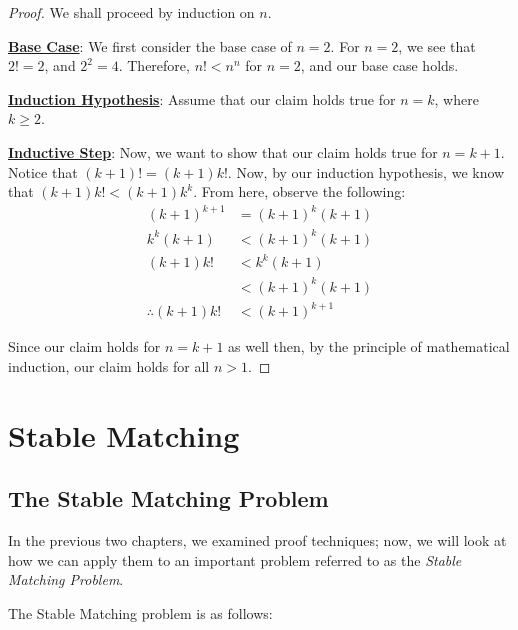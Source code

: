 \documentclass[openany]{book}
\begin{document}
\begin{proof}
	We shall proceed by induction on $n$.
	
	\textbf{\underline{Base Case}}: We first consider the base case of $n=2$. For $n=2$, we see that $2!=2$, and $2^{2}=4$. Therefore, $n! < n^{n}$ for $n=2$, and our base case holds.
	
	\textbf{\underline{Induction Hypothesis}}: Assume that our claim holds true for $n=k$, where $k \geq 2$.
	
	\textbf{\underline{Inductive Step}}: Now, we want to show that our claim holds true for $n=k+1$. Notice that $(k+1)! = (k+1)k!$. Now, by our induction hypothesis, we know that $(k+1)k! < (k+1)k^{k}$. From here, observe the following:
	\begin{align*}
		(k+1)^{k+1} &= (k+1)^{k}(k+1) \\
		k^{k}(k+1) &< (k+1)^{k}(k+1) \\
		(k+1)k! &< k^{k}(k+1) \\
		&< (k+1)^{k}(k+1) \\
		\therefore (k+1)k! &< (k+1)^{k+1}
	\end{align*}

	Since our claim holds for $n=k+1$ as well then, by the principle of mathematical induction, our claim holds for all $n > 1$.
\end{proof}

\newpage

\chapter{Stable Matching}
\section{The Stable Matching Problem}
In the previous two chapters, we examined proof techniques; now, we will look at how we can apply them to an important problem referred to as the \textit{Stable Matching Problem}.

The Stable Matching problem is as follows:
\end{document}
